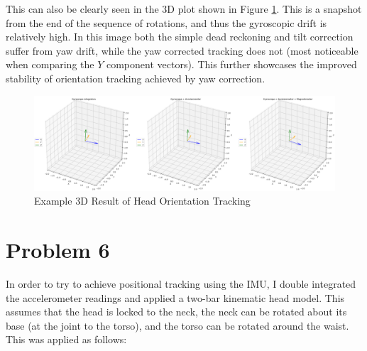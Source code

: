 \documentclass[11pt,a4paper]{article}
\begin{document}
	This can also be clearly seen in the 3D plot shown in Figure \ref{3D_Orientation}. This is a snapshot from the end of the sequence of rotations, and thus the gyroscopic drift is relatively high. In this image both the simple dead reckoning and tilt correction suffer from yaw drift, while the yaw corrected tracking does not (most noticeable when comparing the $Y$ component vectors). This further showcases the improved stability of orientation tracking achieved by yaw correction.
	
	\begin{figure}[h!]
		\centering
		\includegraphics[width=1.0\linewidth]{figures/Orientation_Tracking_3D}
		\caption{Example 3D Result of Head Orientation Tracking}
		\label{3D_Orientation}
	\end{figure}
	
	
	\section*{Problem 6}
	
	In order to try to achieve positional tracking using the IMU, I double integrated the accelerometer readings and applied a two-bar kinematic head model. This assumes that the head is locked to the neck, the neck can be rotated about its base (at the joint to the torso), and the torso can be rotated around the waist. This was applied as follows:
	
\end{document}
